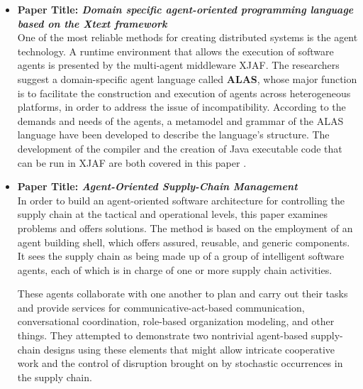 \begin{itemize}[label={}]
\vspace{.5cm}

\item \textbf{Paper Title: \textit{Domain specific agent-oriented programming language based on the Xtext framework}} \\

One of the most reliable methods for creating distributed systems is the agent technology. A runtime environment that allows the execution of software agents is presented by the multi-agent middleware XJAF. The researchers suggest a domain-specific agent language called \textbf{ALAS}, whose major function is to facilitate the construction and execution of agents across heterogeneous platforms, in order to address the issue of incompatibility. According to the demands and needs of the agents, a metamodel and grammar of the ALAS language have been developed to describe the language's structure. The development of the compiler and the creation of Java executable code that can be run in XJAF are both covered in this paper \cite{xtext}.

\vspace{.5cm}

\item \textbf{Paper Title: \textit{Agent-Oriented Supply-Chain Management}} \\

In order to build an agent-oriented software architecture for controlling the supply chain at the tactical and operational levels, this paper \cite{agSupch} examines problems and offers solutions. The method is based on the employment of an agent building shell, which offers assured, reusable, and generic components. It sees the supply chain as being made up of a group of intelligent software agents, each of which is in charge of one or more supply chain activities. 

\vspace{.5cm}

These agents collaborate with one another to plan and carry out their tasks and provide services for communicative-act-based communication, conversational coordination, role-based organization modeling, and other things. They attempted to demonstrate two nontrivial agent-based supply-chain designs using these elements that might allow intricate cooperative work and the control of disruption brought on by stochastic occurrences in the supply chain.

\vspace{.5cm}


\end{itemize}

